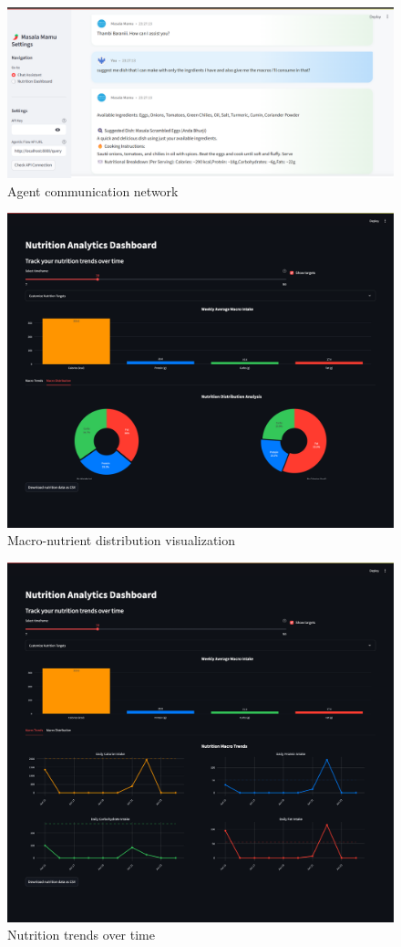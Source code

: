 \documentclass{ecai}
\begin{document}
\begin{figure}[!h]
\centering
\includegraphics[width=\columnwidth]{../images/img_2.png}
\caption{Agent communication network}
\end{figure}

\begin{figure}[!h]
\centering
\includegraphics[width=\columnwidth]{../images/macro_dists.png}
\caption{Macro-nutrient distribution visualization}
\end{figure}

\begin{figure}[!h]
\centering
\includegraphics[width=\columnwidth]{../images/macro_trends.png}
\caption{Nutrition trends over time}
\end{figure}
\end{document}
